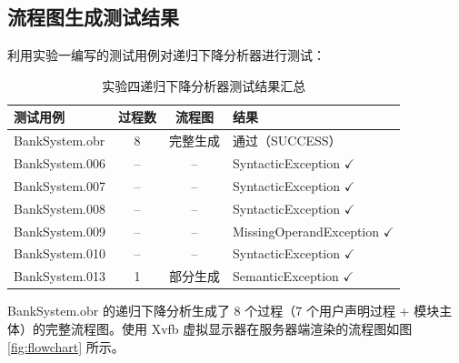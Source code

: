 \subsection{流程图生成测试结果}

利用实验一编写的测试用例对递归下降分析器进行测试：

\begin{table}[htbp]
    \centering
    \begin{tabular}{|l|c|c|l|}
    \hline
    \textbf{测试用例} & \textbf{过程数} & \textbf{流程图} & \textbf{结果} \\
    \hline
    BankSystem.obr & 8 & 完整生成 & 通过（SUCCESS）\\
    BankSystem.006 & -- & -- & SyntacticException $\checkmark$ \\
    BankSystem.007 & -- & -- & SyntacticException $\checkmark$ \\
    BankSystem.008 & -- & -- & SyntacticException $\checkmark$ \\
    BankSystem.009 & -- & -- & MissingOperandException $\checkmark$ \\
    BankSystem.010 & -- & -- & SyntacticException $\checkmark$ \\
    BankSystem.013 & 1 & 部分生成 & SemanticException $\checkmark$ \\
    \hline
    \end{tabular}
    \caption{实验四递归下降分析器测试结果汇总}
    \label{tab:parser4-results}
\end{table}

BankSystem.obr 的递归下降分析生成了 8 个过程（7 个用户声明过程 + 模块主体）的完整流程图。使用 Xvfb 虚拟显示器在服务器端渲染的流程图如图 \ref{fig:flowchart} 所示。

